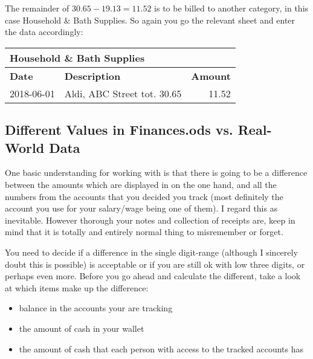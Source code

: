 The remainder of \( 30.65 - 19.13 = 11.52\) is to be billed to another category, in this case Household \& Bath Supplies.
So again you go the relevant sheet and enter the data accordingly:
\begin{center}\sffamily
	\begin{tabular}{|l|l|r|}
		\multicolumn{3}{l}{Household \& Bath Supplies}\\			
		\hline
		\textbf{Date} & \textbf{Description} & \textbf{Amount}\\
		\hline
		2018-06-01 & Aldi, ABC Street tot. 30.65 & 11.52\\
		\hline
	\end{tabular}
\end{center}

\subsection{Different Values in Finances.ods vs. Real-World Data}
\label{subsec:different-values-finances.ods-vs-real-world}

One basic understanding for working with \tfn is that there is going to be a difference between the amounts which are displayed in \tfn on the one hand, and all the numbers from the accounts that you decided you track (most definitely the account you use for your salary/wage being one of them).
I regard this as inevitable.
However thorough your notes and collection of receipts are, keep in mind that it is totally and entirely normal thing to misremember or forget.

You need to decide if a difference in the single digit-range (although I sincerely doubt this is possible) is acceptable or if you are still ok with low three digits, or perhaps even more.
Before you go ahead and calculate the different, take a look at which items make up the difference:
\begin{itemize}
	\item balance in the accounts your are tracking
	\item the amount of cash in your wallet
	\item the amount of cash that each person with access to the tracked accounts has
\end{itemize}